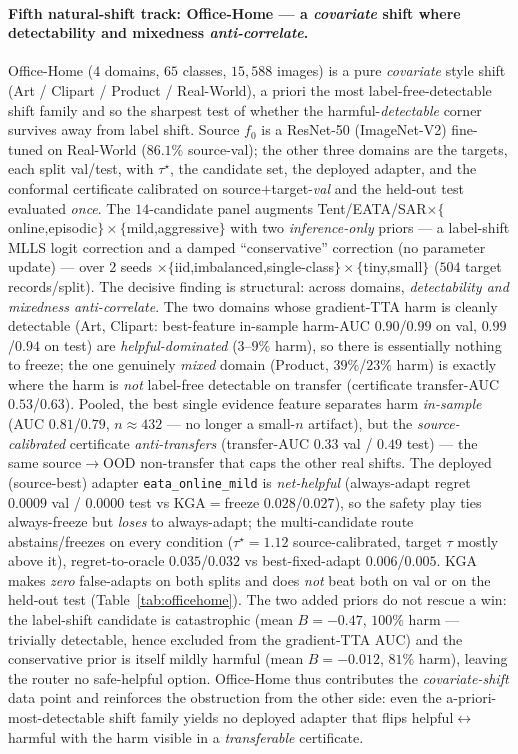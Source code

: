 \documentclass[conference]{IEEEtran}
\theoremstyle{plain}
\theoremstyle{definition}
\begin{document}
\paragraph{Fifth natural-shift track: Office-Home --- a \emph{covariate} shift where detectability and mixedness \emph{anti-correlate}.}
Office-Home ($4$ domains, $65$ classes, $15{,}588$ images) is a pure \emph{covariate} style shift
(Art / Clipart / Product / Real-World), a priori the most label-free-detectable shift family and so
the sharpest test of whether the harmful-\emph{detectable} corner survives away from label shift.
Source $f_0$ is a ResNet-50 (ImageNet-V2) fine-tuned on Real-World ($86.1\%$ source-val); the other
three domains are the targets, each split val/test, with $\tau^\star$, the candidate set, the
deployed adapter, and the conformal certificate calibrated on source$+$target-\emph{val} and the
held-out test evaluated \emph{once}. The $14$-candidate panel augments
Tent/EATA/SAR$\times\{$online,episodic$\}\times\{$mild,aggressive$\}$ with two \emph{inference-only}
priors --- a label-shift MLLS logit correction and a damped ``conservative'' correction (no
parameter update) --- over $2$ seeds $\times\{$iid,imbalanced,single-class$\}\times\{$tiny,small$\}$
($504$ target records/split). The decisive finding is structural: across domains, \emph{detectability
and mixedness anti-correlate}. The two domains whose gradient-TTA harm is cleanly detectable (Art,
Clipart: best-feature in-sample harm-AUC $0.90$/$0.99$ on val, $0.99$/$0.94$ on test) are
\emph{helpful-dominated} ($3$--$9\%$ harm), so there is essentially nothing to freeze; the one
genuinely \emph{mixed} domain (Product, $39\%$/$23\%$ harm) is exactly where the harm is \emph{not}
label-free detectable on transfer (certificate transfer-AUC $0.53$/$0.63$). Pooled, the best single
evidence feature separates harm \emph{in-sample} (AUC $0.81$/$0.79$, $n{\approx}432$ --- no longer a
small-$n$ artifact), but the \emph{source-calibrated} certificate \emph{anti-transfers}
(transfer-AUC $0.33$ val / $0.49$ test) --- the same source$\to$OOD non-transfer that caps the other
real shifts. The deployed (source-best) adapter \texttt{eata\_online\_mild} is \emph{net-helpful}
(always-adapt regret $0.0009$ val / $0.0000$ test vs \textsc{KGA}$=$freeze $0.028$/$0.027$), so the
safety play ties always-freeze but \emph{loses} to always-adapt; the multi-candidate route
abstains/freezes on every condition ($\tau^\star{=}1.12$ source-calibrated, target $\tau$ mostly
above it), regret-to-oracle $0.035$/$0.032$ vs best-fixed-adapt $0.006$/$0.005$. \textsc{KGA} makes
\emph{zero} false-adapts on both splits and does \emph{not} beat both on val or on the held-out test
(Table~\ref{tab:officehome}). The two added priors do not rescue a win: the label-shift candidate is
catastrophic (mean $B{=}{-}0.47$, $100\%$ harm --- trivially detectable, hence excluded from the
gradient-TTA AUC) and the conservative prior is itself mildly harmful (mean $B{=}{-}0.012$, $81\%$
harm), leaving the router no safe-helpful option. Office-Home thus contributes the
\emph{covariate-shift} data point and reinforces the obstruction from the other side: even the
a-priori-most-detectable shift family yields no deployed adapter that flips
helpful$\leftrightarrow$harmful with the harm visible in a \emph{transferable} certificate.
\end{document}
